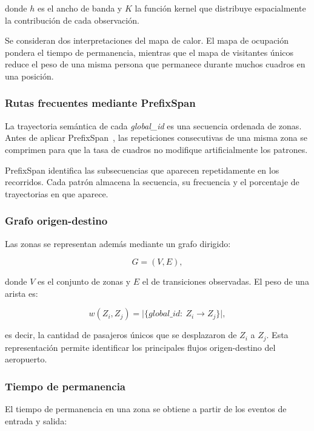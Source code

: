 \documentclass[12pt,a4paper]{article}
\begin{document}
donde $h$ es el ancho de banda y $K$ la función kernel que distribuye
espacialmente la contribución de cada observación.

Se consideran dos interpretaciones del mapa de calor. El mapa de
ocupación pondera el tiempo de permanencia, mientras que el mapa de
visitantes únicos reduce el peso de una misma persona que permanece
durante muchos cuadros en una posición.

\subsubsection{Rutas frecuentes mediante PrefixSpan}

La trayectoria semántica de cada \textit{global\_id} es una secuencia
ordenada de zonas. Antes de aplicar PrefixSpan~\cite{pei2001}, las repeticiones
consecutivas de una misma zona se comprimen para que la tasa de cuadros
no modifique artificialmente los patrones.

PrefixSpan identifica las subsecuencias que aparecen repetidamente en los
recorridos. Cada patrón almacena la secuencia, su frecuencia y el
porcentaje de trayectorias en que aparece.

\subsubsection{Grafo origen-destino}

Las zonas se representan además mediante un grafo dirigido:

\begin{equation}
G=(V,E),
\end{equation}

donde $V$ es el conjunto de zonas y $E$ el de transiciones observadas. El
peso de una arista es:

\begin{equation}
w(Z_i,Z_j)
=
\big|\{global\_id:\ Z_i\rightarrow Z_j\}\big|,
\end{equation}

es decir, la cantidad de pasajeros únicos que se desplazaron de $Z_i$ a
$Z_j$. Esta representación permite identificar los principales flujos
origen-destino del aeropuerto.

\subsubsection{Tiempo de permanencia}

El tiempo de permanencia en una zona se obtiene a partir de los eventos
de entrada y salida:
\end{document}
